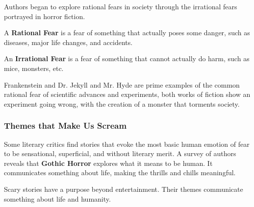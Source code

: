 Authors began to explore rational fears in society through the irrational fears
portrayed in horror fiction.

\begin{definition}
  \label{def:rational_fear}

  A \textbf{Rational Fear} is a fear of something that actually poses some
  danger, such as diseases, major life changes, and accidents.
\end{definition}

\begin{definition}
  \label{def:irrational_fear}

  An \textbf{Irrational Fear} is a fear of something that cannot actually do
  harm, such as mice, monsters, etc.
\end{definition}

\begin{example}
  \label{exm:irrational_fear}

  Frankenstein and Dr. Jekyll and Mr. Hyde are prime examples of the common
  rational fear of scientific advances and experiments, both works of fiction
  show an experiment going wrong, with the creation of a monster that torments
  society.
\end{example}


\subsubsection{Themes that Make Us Scream}
\label{sub_sub_sec:themes_that_make_us_scream}

Some literary critics find stories that evoke the most basic human emotion of
fear to be sensational, superficial, and without literary merit. A survey of
authors reveals that \textbf{Gothic Horror} explores what it means to be human.
It communicates something about life, making the thrills and chills meaningful.

Scary stories have a purpose beyond entertainment. Their themes communicate
something about life and humanity.

